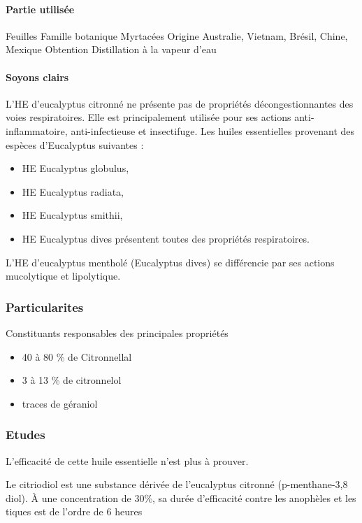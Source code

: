 \documentclass[12pt,a4wide]{article}
\begin{document}
\paragraph{Partie utilisée}
\label{sec-4-5-2-2}
Feuilles
Famille botanique
Myrtacées
Origine
Australie, Vietnam, Brésil, Chine, Mexique
Obtention
Distillation à la vapeur d'eau
\paragraph{Soyons clairs}
\label{sec-4-5-2-3}

L'HE d'eucalyptus citronné ne présente pas de propriétés décongestionnantes des voies respiratoires. Elle est principalement utilisée pour ses actions anti-inflammatoire, anti-infectieuse et insectifuge.
Les huiles essentielles provenant des espèces d'Eucalyptus suivantes :
\begin{itemize}
\item HE Eucalyptus globulus,
\item HE Eucalyptus radiata,
\item HE Eucalyptus smithii,
\item HE Eucalyptus dives présentent toutes des propriétés respiratoires.
\end{itemize}

L'HE d'eucalyptus mentholé (Eucalyptus dives) se différencie par ses actions mucolytique et lipolytique.


\subsubsection{Particularites}
\label{sec-4-5-3}

Constituants responsables des principales propriétés
\begin{itemize}
\item 40 à 80 \% de Citronnellal
\item 3 à 13 \% de citronnelol
\item traces de géraniol
\end{itemize}

\subsubsection{Etudes}
\label{sec-4-5-4}

L'efficacité de cette huile essentielle n'est plus à prouver.

Le citriodiol est une substance dérivée de l'eucalyptus citronné (p-menthane-3,8
diol). À une concentration de 30\%, sa durée d'efficacité contre les anophèles et
les tiques est de l'ordre de 6 heures \cite{Trigg1996,Caroll2006}
\end{document}
